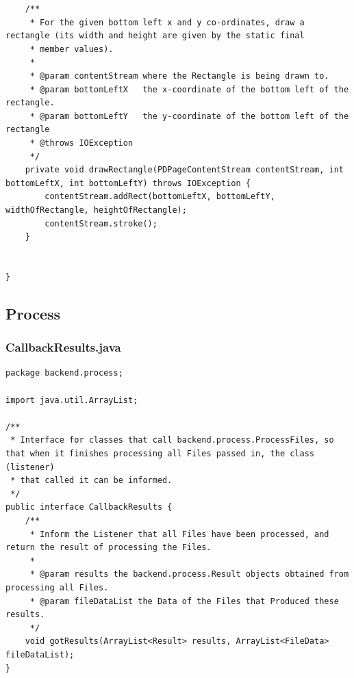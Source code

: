 \begin{lstlisting}
    /**
     * For the given bottom left x and y co-ordinates, draw a rectangle (its width and height are given by the static final
     * member values).
     *
     * @param contentStream where the Rectangle is being drawn to.
     * @param bottomLeftX   the x-coordinate of the bottom left of the rectangle.
     * @param bottomLeftY   the y-coordinate of the bottom left of the rectangle
     * @throws IOException
     */
    private void drawRectangle(PDPageContentStream contentStream, int bottomLeftX, int bottomLeftY) throws IOException {
        contentStream.addRect(bottomLeftX, bottomLeftY, widthOfRectangle, heightOfRectangle);
        contentStream.stroke();
    }


}
\end{lstlisting}
\subsection{Process}
\subsubsection{CallbackResults.java}
\begin{lstlisting}
package backend.process;

import java.util.ArrayList;

/**
 * Interface for classes that call backend.process.ProcessFiles, so that when it finishes processing all Files passed in, the class (listener)
 * that called it can be informed.
 */
public interface CallbackResults {
    /**
     * Inform the Listener that all Files have been processed, and return the result of processing the Files.
     *
     * @param results the backend.process.Result objects obtained from processing all Files.
     * @param fileDataList the Data of the Files that Produced these results.
     */
    void gotResults(ArrayList<Result> results, ArrayList<FileData> fileDataList);
}
\end{lstlisting}
